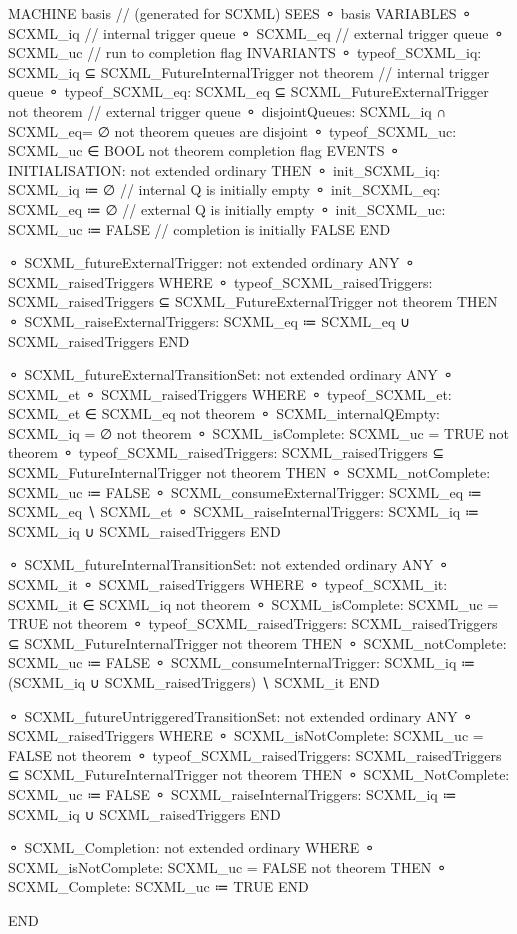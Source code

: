 \begin{EventBcode}
MACHINE
		basis 	// (generated for SCXML)
	SEES
	⚬	 basis 
	VARIABLES
	⚬	SCXML_iq	 // internal trigger queue
	⚬	SCXML_eq	 // external trigger queue
	⚬	SCXML_uc	 // run to completion flag
	INVARIANTS
	⚬	typeof_SCXML_iq:	SCXML_iq ⊆ SCXML_FutureInternalTrigger not theorem // internal trigger queue
	⚬	typeof_SCXML_eq:	SCXML_eq ⊆ SCXML_FutureExternalTrigger not theorem // external trigger queue
	⚬	disjointQueues:	SCXML_iq ∩ SCXML_eq= ∅ not theorem queues are disjoint
	⚬	typeof_SCXML_uc:	SCXML_uc ∈ BOOL not theorem completion flag
	EVENTS
	⚬	INITIALISATION:	 not extended ordinary 
		THEN
		⚬	init_SCXML_iq:	SCXML_iq ≔ ∅ // internal Q is initially empty
		⚬	init_SCXML_eq:	SCXML_eq ≔ ∅ // external Q is initially empty
		⚬	init_SCXML_uc:	SCXML_uc ≔ FALSE // completion is initially FALSE
		END

	⚬	SCXML_futureExternalTrigger:	 not extended ordinary 
		ANY
		⚬	SCXML_raisedTriggers	 
		WHERE
		⚬	typeof_SCXML_raisedTriggers:	SCXML_raisedTriggers ⊆ SCXML_FutureExternalTrigger not theorem 
		THEN
		⚬	SCXML_raiseExternalTriggers:	SCXML_eq ≔ SCXML_eq ∪ SCXML_raisedTriggers 
		END

	⚬	SCXML_futureExternalTransitionSet:	 not extended ordinary 
		ANY
		⚬	SCXML_et	 
		⚬	SCXML_raisedTriggers	 
		WHERE
		⚬	typeof_SCXML_et:	SCXML_et ∈ SCXML_eq not theorem 
		⚬	SCXML_internalQEmpty:	SCXML_iq = ∅ not theorem 
		⚬	SCXML_isComplete:	SCXML_uc = TRUE not theorem 
		⚬	typeof_SCXML_raisedTriggers:	SCXML_raisedTriggers ⊆ SCXML_FutureInternalTrigger not theorem 
		THEN
		⚬	SCXML_notComplete:	SCXML_uc ≔ FALSE 
		⚬	SCXML_consumeExternalTrigger:	SCXML_eq ≔ SCXML_eq ∖ {SCXML_et} 
		⚬	SCXML_raiseInternalTriggers:	SCXML_iq ≔ SCXML_iq ∪ SCXML_raisedTriggers 
		END

	⚬	SCXML_futureInternalTransitionSet:	 not extended ordinary 
		ANY
		⚬	SCXML_it	 
		⚬	SCXML_raisedTriggers	 
		WHERE
		⚬	typeof_SCXML_it:	SCXML_it  ∈ SCXML_iq not theorem 
		⚬	SCXML_isComplete:	SCXML_uc = TRUE not theorem 
		⚬	typeof_SCXML_raisedTriggers:	SCXML_raisedTriggers ⊆ SCXML_FutureInternalTrigger not theorem 
		THEN
		⚬	SCXML_notComplete:	SCXML_uc ≔ FALSE 
		⚬	SCXML_consumeInternalTrigger:	SCXML_iq ≔ (SCXML_iq ∪ SCXML_raisedTriggers) ∖ {SCXML_it} 
		END

	⚬	SCXML_futureUntriggeredTransitionSet:	 not extended ordinary 
		ANY
		⚬	SCXML_raisedTriggers	 
		WHERE
		⚬	SCXML_isNotComplete:	SCXML_uc = FALSE not theorem 
		⚬	typeof_SCXML_raisedTriggers:	SCXML_raisedTriggers ⊆ SCXML_FutureInternalTrigger not theorem 
		THEN
		⚬	SCXML_NotComplete:	SCXML_uc ≔ FALSE 
		⚬	SCXML_raiseInternalTriggers:	SCXML_iq ≔ SCXML_iq ∪ SCXML_raisedTriggers 
		END

	⚬	SCXML_Completion:	 not extended ordinary 
		WHERE
		⚬	SCXML_isNotComplete:	SCXML_uc = FALSE not theorem 
		THEN
		⚬	SCXML_Complete:	SCXML_uc ≔ TRUE 
		END

	END
\end{EventBcode}




